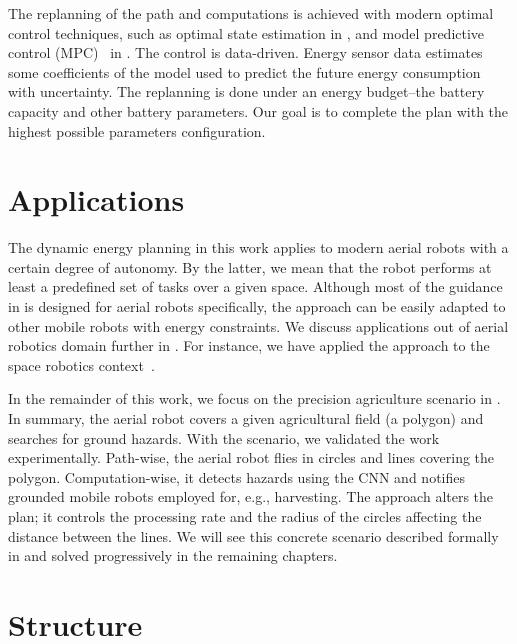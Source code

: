 The replanning of the path and computations is achieved with modern optimal control techniques, such as optimal state estimation in , and  model predictive control (MPC)~\citep{rawlings2017model} in . The control is data-driven. Energy sensor data estimates some coefficients of the model used to predict the future energy consumption with uncertainty. The replanning is done under an energy budget--the battery capacity and other battery parameters. Our goal is to complete the plan with the highest possible parameters configuration. 


\section{Applications}

The dynamic energy planning in this work applies to modern aerial robots with a certain degree of autonomy. By the latter, we mean that the robot performs at least a predefined set of tasks over a given space. Although most of the guidance in  is designed for aerial robots specifically, the approach can be easily adapted to other mobile robots with energy constraints. We discuss applications out of aerial robotics domain further in . For instance, we have applied the approach to the space robotics context~\citep{seewald2020beyond}. 

In the remainder of this work, we focus on the precision agriculture scenario in . In summary, the aerial robot covers a given agricultural field (a polygon) and searches for ground hazards. With the scenario, we validated the work experimentally. Path-wise, the aerial robot flies in circles and lines covering the polygon. Computation-wise, it detects hazards using the CNN and notifies grounded mobile robots employed for, e.g., harvesting. The approach alters the plan; it controls the processing rate and the radius of the circles affecting the distance between the lines. We will see this concrete scenario described formally in  and solved progressively in the remaining chapters.



\section{Structure}
\label{sec:structure}

